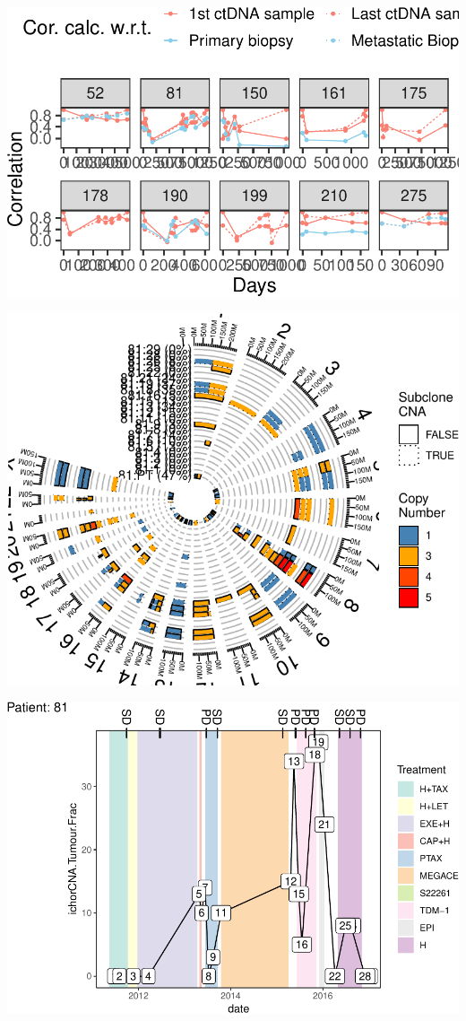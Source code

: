 \documentclass[]{article}
\begin{document}
\begin{center}\includegraphics{detect.her2.manuscript_files/figure-latex/distance.1st_nth.plot-1} \end{center}

\begin{center}\includegraphics{detect.her2.manuscript_files/figure-latex/casestudy.circus.plot-1} \end{center}

\begin{center}\includegraphics{detect.her2.manuscript_files/figure-latex/casestudy.timeline.plot-1} \end{center}
\end{document}

